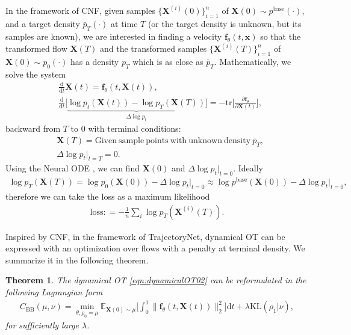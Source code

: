 \documentclass[11pt]{book}
\newtheorem{theorem}{Theorem}[section]
\newcommand{\dt}{\mathrm{d}t}
\begin{document}
In the framework of CNF, given samples $\{\mathbf{X}^{(i)}(0)\}_{i=1}^n$ of $\mathbf{X}(0) \sim p^{\mathrm{base}}(\cdot)$, and a target density $\bar{p}_T(\cdot)$ at time $T$ (or the target density is unknown, but its samples are known), we are interested in finding a velocity $\mathbf{f}_{\theta}(t,\mathbf{x})$ so that the transformed flow $\mathbf{X}(T)$ and the transformed samples $\{\mathbf{X}^{(i)}(T)\}_{i=1}^n$ of $\mathbf{X}(0) \sim p_0(\cdot)$ has a density $p_T$ which is as close as $\bar{p}_T$. Mathematically, we solve the system
\begin{align*}
    &\frac{\mathrm{d}}{\mathrm{d}t}\mathbf{X}(t) = \mathbf{f}_{\theta}(t,\mathbf{X}(t)), \\
    & \frac{\mathrm{d}}{\mathrm{d}t} \Big[ \underbrace{\log p_t(\mathbf{X}(t)) - \log p_T(\mathbf{X}(T)) }_{\Delta\log p_t} \Big] = -\mathrm{tr}\bigg[ \frac{\partial \mathbf{f}_{\theta}}{\partial \mathbf{X}(t)} \bigg],
\end{align*}
backward from $T$ to $0$ with terminal conditions:
\begin{align*}
    &\mathbf{X}(T) = \mathrm{Given\ sample\ points\ with\ unknown\ density\ }\bar{p}_T, \\
    & \Delta\log p_t \big|_{t=T} = 0.
\end{align*}
Using the Neural ODE \cite{chen2018neural}, we can find $\mathbf{X}(0)$ and $\Delta\log p_t |_{t=0}$. Ideally
\begin{align*}
    \log p_T(\mathbf{X}(T))  = \log p_0(\mathbf{X}(0)) - \Delta \log p_t \Big|_{t=0}  \approx \log p^{\mathrm{base}}(\mathbf{X}(0)) - \Delta \log p_t \Big|_{t=0},
\end{align*}
therefore we can take the loss as a maximum likelihood
\begin{align*}
    \mathrm{loss}: = - \frac{1}{n}\sum_i \log p_T(\mathbf{X}^{(i)}(T)).
\end{align*}

Inspired by CNF, in the framework of TrajectoryNet, dynamical OT can be expressed with an optimization over flows with a penalty at terminal density. We summarize it in the following theorem.
\begin{theorem}
    The dynamical OT \eqref{eqn:dynamicalOT02} can be reformulated in the following Lagrangian form
    \begin{align*}
        C_{\mathrm{BB}}(\mu,\nu) = \min_{\theta, \rho_0=\mu} \mathbb{E}_{\mathbf{X}(0)\sim\mu} \bigg[ \int_0^1 \|\mathbf{f}_{\theta}(t,\mathbf{X}(t))\|_2^2 \bigg]\dt + \lambda \mathrm{KL}(\rho_1|\nu),
    \end{align*}
    for sufficiently large $\lambda$.
\end{theorem}
\end{document}
